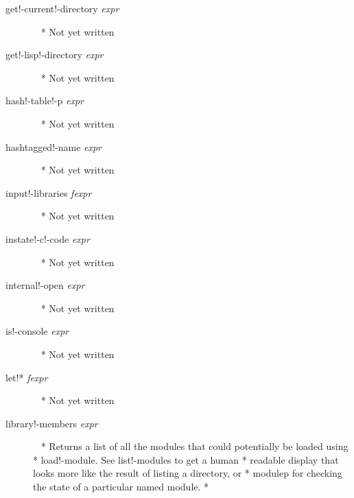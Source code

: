 \documentclass[a4paper,11pt]{article}
\begin{document}
\begin{description}
\item [{\ttfamily get!-current!-directory} {\itshape  expr}]  ~\newline
  * Not yet written

\item [{\ttfamily get!-lisp!-directory} {\itshape  expr}]  ~\newline
  * Not yet written

\item [{\ttfamily hash!-table!-p} {\itshape  expr}]  ~\newline
  * Not yet written

\item [{\ttfamily hashtagged!-name} {\itshape  expr}]  ~\newline
  * Not yet written

\item [{\ttfamily input!-libraries} {\itshape  fexpr}]  ~\newline
  * Not yet written

\item [{\ttfamily instate!-c!-code} {\itshape  expr}]  ~\newline
  * Not yet written

\item [{\ttfamily internal!-open} {\itshape  expr}]  ~\newline
  * Not yet written

\item [{\ttfamily is!-console} {\itshape  expr}]  ~\newline
  * Not yet written

\item [{\ttfamily let!*} {\itshape  fexpr}]  ~\newline
  * Not yet written

\item [{\ttfamily library!-members} {\itshape  expr}]  ~\newline
  * Returns a list of all the modules that could potentially be loaded using
  * {\ttfamily load!-module}. See {\ttfamily list!-modules} to get a human
  * readable display that looks more like the result of listing a directory, or
  * {\ttfamily modulep} for checking the state of a particular named module.
  *


\end{description}
\end{document}
